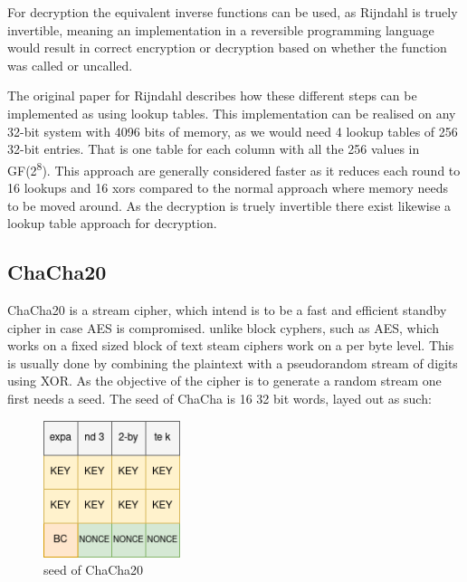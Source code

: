 \documentclass[a4paper]{article}
\begin{document}
For decryption the equivalent inverse functions can be used, as Rijndahl is truely invertible, meaning an implementation in a reversible programming language would result in correct encryption or decryption based on whether the function was called or uncalled.

The original paper for Rijndahl\cite{Rijndahl} describes how these different steps can be implemented as using lookup tables. This implementation can be realised on any 32-bit system with 4096 bits of memory, as we would need 4 lookup tables of 256 32-bit entries. That is one table for each column with all the 256 values in GF(2\textsuperscript{8}). This approach are generally considered faster as it reduces each round to 16 lookups and 16 xors compared to the normal approach where memory needs to be moved around. As the decryption is truely invertible there exist likewise a lookup table approach for decryption.
\subsection{ChaCha20}
\label{sec:orgdc8e770}
ChaCha20 is a stream cipher, which intend is to be a fast and efficient standby cipher in case AES is compromised. unlike block cyphers, such as AES, which works on a fixed sized block of text steam ciphers work on a per byte level. This is usually done by combining the plaintext with a pseudorandom stream of digits using XOR. As the objective of the cipher is to generate a random stream one first needs a seed. The seed of ChaCha is 16 32 bit words, layed out as such:
\begin{figure}[htbp]
\centering
\includegraphics[width=4cm]{./Background/ChaChaSeed.png}
\caption{\label{fig:orgbb4bd06}seed of ChaCha20}
\end{figure}
\end{document}
